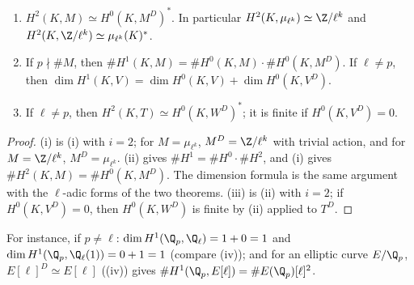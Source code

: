 \begin{corollary}\label{cor:galcoh:local-duality-consequences}
\begin{enumerate}[label=(\roman*)]
\item $H^2(K,M)\simeq H^0(K,M^D)^*$. In particular $H^2(K,\mu_{\ell^k})\simeq\Z/\ell^k$ and $H^2(K,\Z/\ell^k)\simeq\mu_{\ell^k}(K)^*$.
\item If $p\nmid\#M$, then $\#H^1(K,M)=\#H^0(K,M)\cdot\#H^0(K,M^D)$. If $\ell\ne p$, then $\dim H^1(K,V)=\dim H^0(K,V)+\dim H^0(K,V^D)$.
\item If $\ell\ne p$, then $H^2(K,T)\simeq H^0(K,W^D)^*$; it is finite if $H^0(K,V^D)=0$.
\end{enumerate}
\end{corollary}

\begin{proof}
(i) is (i) with $i=2$; for $M=\mu_{\ell^k}$, $M^D=\Z/\ell^k$ with trivial action, and for $M=\Z/\ell^k$, $M^D=\mu_{\ell^k}$. (ii)
 gives $\#H^1=\#H^0\cdot\#H^2$, and (i) gives $\#H^2(K,M)=\#H^0(K,M^D)$. The dimension formula is the same argument with the $\ell$-adic
forms of the two theorems. (iii) is (ii) with $i=2$; if $H^0(K,V^D)=0$, then $H^0(K,W^D)$ is finite by (ii)
applied to $T^D$.
\end{proof}

\noindent For instance, if $p\ne\ell$: $\dim H^1(\Q_p,\Q_\ell)=1+0=1$ and $\dim H^1(\Q_p,\Q_\ell(1))=0+1=1$ (compare (iv)); and for an
elliptic curve $E/\Q_p$, $E[\ell]^D\simeq E[\ell]$ ((iv)) gives $\#H^1(\Q_p,E[\ell])=\#E(\Q_p)[\ell]^2$.

